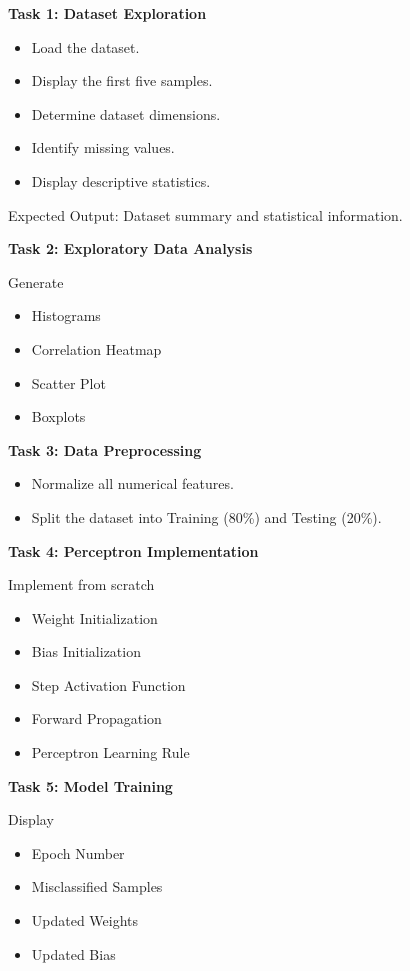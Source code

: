 \documentclass[11pt]{article}
\begin{document}
\textbf{Task 1: Dataset Exploration}
\begin{itemize}
\item Load the dataset.
\item Display the first five samples.
\item Determine dataset dimensions.
\item Identify missing values.
\item Display descriptive statistics.
\end{itemize}
Expected Output: Dataset summary and statistical information.

\vspace{2mm}

\textbf{Task 2: Exploratory Data Analysis}

Generate
\begin{itemize}
\item Histograms
\item Correlation Heatmap
\item Scatter Plot
\item Boxplots
\end{itemize}

\vspace{2mm}

\textbf{Task 3: Data Preprocessing}
\begin{itemize}
\item Normalize all numerical features.
\item Split the dataset into Training (80\%) and Testing (20\%).
\end{itemize}

\vspace{2mm}

\textbf{Task 4: Perceptron Implementation}

Implement from scratch
\begin{itemize}
\item Weight Initialization
\item Bias Initialization
\item Step Activation Function
\item Forward Propagation
\item Perceptron Learning Rule
\end{itemize}

\vspace{2mm}

\textbf{Task 5: Model Training}

Display
\begin{itemize}
\item Epoch Number
\item Misclassified Samples
\item Updated Weights
\item Updated Bias
\end{itemize}
\end{document}
